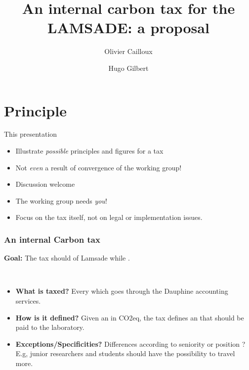 \documentclass[french, english]{beamer}
\title[Proposal for a tax]{An internal carbon tax for the LAMSADE: a proposal}
\author{Olivier Cailloux \and Hugo Gilbert}
\institute[LAMSADE]{LAMSADE, Université Paris-Dauphine, PSL}
\date{\formatdate{11}{10}{2022}}
\begin{document}
\begin{frame}[plain]
	\titlepage
\end{frame}
\addtocounter{framenumber}{-1}

\section{Principle}
\begin{frame}{This presentation}
	\begin{itemize}
		\item Illustrate \emph{possible} principles and figures for a tax
		\item Not \emph{even} a result of convergence of the working group!
		\item Discussion welcome
		\item The working group needs \emph{you}!
		\item Focus on the tax itself, not on legal or implementation issues.
	\end{itemize}
\end{frame}

\frame
{
  \frametitle{An internal Carbon tax}

\textbf{Goal:} The tax should  of Lamsade while . 

\

  \begin{itemize}
  \item \textbf{What is taxed?} Every  which goes through the Dauphine accounting services.
  \item \textbf{How is it defined?} Given an  in CO2eq, the tax defines an  that should be paid to the laboratory.
  \item \textbf{Exceptions/Specificities?} Differences according to seniority or position ? E.g, junior researchers and students should have the possibility to travel more.
  \end{itemize}
}
\end{document}
